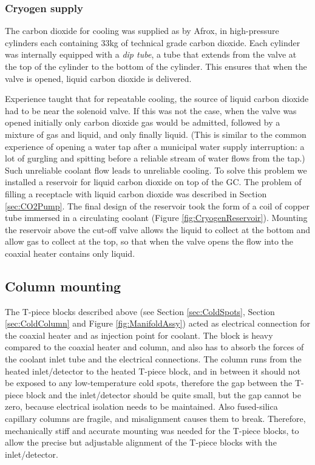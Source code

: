 \subsubsection{Cryogen supply}

The carbon dioxide for cooling was supplied as by Afrox, in high-pressure
cylinders each containing 33kg of technical grade carbon dioxide. Each cylinder
was internally equipped with a \textit{dip tube}, a tube that extends from the
valve at the top of the cylinder to the bottom of the cylinder. This ensures
that when the valve is opened, liquid carbon dioxide is delivered.

Experience taught that for repeatable cooling, the source of liquid carbon
dioxide had to be near the solenoid valve. If this was not the case, when the
valve was opened initially only carbon dioxide gas would be admitted, followed
by a mixture of gas and liquid, and only finally liquid. (This is similar to the
common experience of opening a water tap after a municipal water supply
interruption: a lot of gurgling and spitting before a reliable stream of water
flows from the tap.) Such unreliable coolant flow leads to unreliable cooling.
To solve this problem we installed a reservoir for liquid carbon dioxide on top
of the GC. The problem of filling a receptacle with liquid carbon dioxide was
described in Section \ref{sec:CO2Pump}. The final design of the reservoir took
the form of a coil of copper tube immersed in a circulating coolant (Figure
\ref{fig:CryogenReservoir}). Mounting the reservoir above the cut-off valve
allows the liquid to collect at the bottom and allow gas to collect at the top,
so that when the valve opens the flow into the coaxial heater contains only
liquid.

\subsection{Column mounting}

The T-piece blocks described above (see Section \ref{sec:ColdSpots}, Section
\ref{sec:ColdColumn} and Figure \ref{fig:ManifoldAssy}) acted as electrical
connection for the coaxial heater and as injection point for coolant. The block
is heavy compared to the coaxial heater and column, and also has to absorb the
forces of the coolant inlet tube and the electrical connections. The column runs
from the heated inlet/detector to the heated T-piece block, and in between it
should not be exposed to any low-temperature cold spots, therefore the gap
between the T-piece block and the inlet/detector should be quite small, but the
gap cannot be zero, because electrical isolation needs to be maintained.
Also fused-silica capillary columns are fragile, and misalignment causes them to
break. Therefore, mechanically stiff and accurate mounting was needed for the
T-piece blocks, to allow the precise but adjustable alignment of the T-piece
blocks with the inlet/detector.

